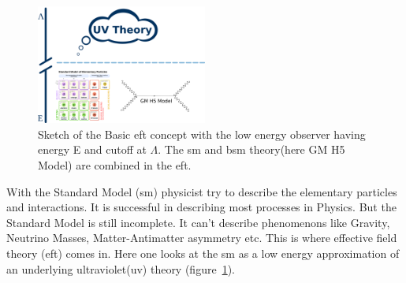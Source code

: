 \documentclass[../Bachelorarbeit.tex]{subfiles}
\begin{document}
\label{sec:EFT}

\begin{figure}[h]
    \centering
    \includegraphics[width=0.5\textwidth]{images/EFT_Model.png}
    \caption{Sketch of the Basic \acrshort{eft} concept with the low energy observer having energy E and cutoff at $\Lambda$. The \acrshort{sm} and \acrshort{bsm} theory(here GM H5 Model) are combined in the \acrshort{eft}. \cite{Brivio.2017}}
    \label{fig:EFT_sketch}
\end{figure}

With the Standard Model (\acrshort{sm}) physicist try to describe the elementary particles and interactions. It is successful in describing most processes in Physics.
But the Standard Model is still incomplete. It can't describe phenomenons like Gravity, Neutrino Masses, Matter-Antimatter asymmetry etc. This is where effective field theory (\acrshort{eft}) comes in.
Here one looks at the \acrshort{sm} as a low energy approximation of an underlying ultraviolet(\acrshort{uv}) theory (figure~\ref{fig:EFT_sketch}).

\end{document}

